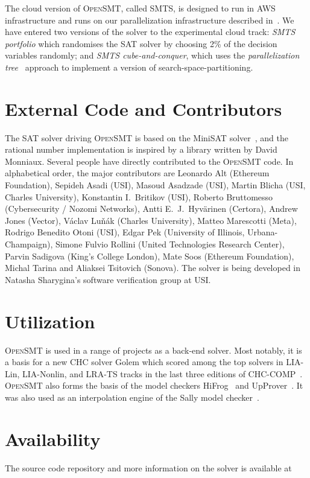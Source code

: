 \documentclass{easychair}
\newcommand{\opensmt}{\textsc{OpenSMT}\xspace}
\begin{document}
The cloud version of \opensmt, called SMTS, is designed to run in AWS
infrastructure and runs on our parallelization infrastructure described
in~\cite{MarescottiHS18}.
%
We have entered two versions of the solver to the experimental cloud
track: {\em SMTS portfolio} which randomises the SAT solver by choosing
2\% of the decision variables randomly; and {\em SMTS cube-and-conquer},
which uses the {\em parallelization tree}~\cite{HyvarinenMS:SAT15}
approach to implement a version of search-space-partitioning.
\fi

\section{External Code and Contributors}

The SAT solver driving \opensmt is based on the MiniSAT
solver~\cite{EenS:SAT03}, and the rational number implementation is
inspired by a library written by David Monniaux.  Several people have
directly contributed to the \opensmt code.  In alphabetical order, the
major contributors are
%
Leonardo Alt (Ethereum Foundation),
Sepideh Asadi (USI),
Masoud Asadzade (USI),
Martin Blicha (USI, Charles University),
Konstantin I.~Britikov (USI),
Roberto Bruttomesso (Cybersecurity / Nozomi Networks),
Antti E.~J.~Hyv{\"a}rinen (Certora),
Andrew Jones (Vector),
V{\'a}clav Lu{\v n}{\'a}k (Charles University),
Matteo Marescotti (Meta),
Rodrigo Benedito Otoni (USI),
Edgar Pek (University of Illinois, Urbana-Champaign),
Simone Fulvio Rollini (United Technologies Research Center),
Parvin Sadigova (King's College London),
Mate Soos (Ethereum Foundation),
Michal Tarina
and Aliaksei Tsitovich (Sonova).
%
The solver is being developed in Natasha Sharygina's software
verification group at USI.

\section{Utilization}

\opensmt is used in a range of projects as a back-end solver.
Most notably, it is a basis for a new CHC solver Golem which scored among the top solvers
in LIA-Lin, LIA-Nonlin, and LRA-TS tracks in the last three editions of CHC-COMP~\cite{Rummer_2020,Rummer_2021,De_Angelis_2022}.
\opensmt also forms the basis of the model checkers HiFrog~\cite{AltACMFHS17} and
UpProver~\cite{Asadi_2020b}.
It was also used as an interpolation engine of the Sally model
checker~\cite{JovanovicD:FMCAD16}.

\section{Availability}
The source code repository and more information on the solver is
available at
\end{document}
